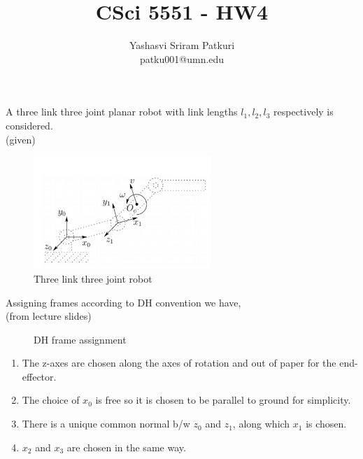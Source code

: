 \documentclass[12pt]{article}
\title{CSci 5551 - HW4}
\author{Yashasvi Sriram Patkuri\\patku001@umn.edu}
\newcommand{\fromlectures}{{\\ \color{blue} \hspace*{\fill}(from lecture slides)} \\}
\newcommand{\given}{{\\ \color{blue} \hspace*{\fill}(given)} \\}
\begin{document}
\maketitle
\pagebreak

\section{}
A three link three joint planar robot with link lengths $l_1, l_2, l_3$ respectively is considered.
\given

\begin{figure}[h]
  \centering
  \includegraphics[width=0.6\textwidth]{q1.png}
  \caption{Three link three joint robot}
  \label{fig:q1.1}
\end{figure}
Assigning frames according to DH convention we have,
\fromlectures
\begin{figure}[h]
  \centering
  \caption{DH frame assignment}
  \label{fig:q1.2}
\end{figure}

\begin{enumerate}[nolistsep]
  \item The z-axes are chosen along the axes of rotation and out of paper for the end-effector.
  \item The choice of $x_0$ is free so it is chosen to be parallel to ground for simplicity.
  \item There is a unique common normal b/w $z_0$ and $z_1$, along which $x_1$ is chosen.
  \item $x_2$ and $x_3$ are chosen in the same way.
\end{enumerate}
\end{document}
